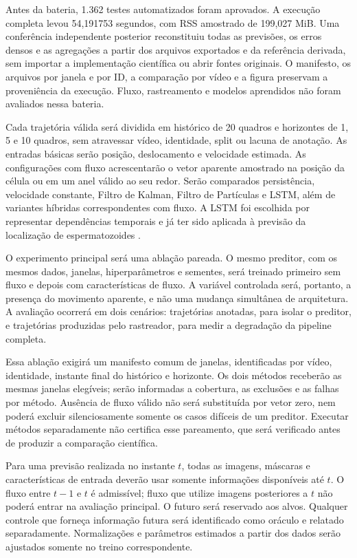 Antes da bateria, 1.362 testes automatizados foram aprovados. A execução completa levou 54,191753 segundos, com RSS amostrado de 199,027 MiB. Uma conferência independente posterior reconstituiu todas as previsões, os erros densos e as agregações a partir dos arquivos exportados e da referência derivada, sem importar a implementação científica ou abrir fontes originais. O manifesto, os arquivos por janela e por ID, a comparação por vídeo e a figura preservam a proveniência da execução. Fluxo, rastreamento e modelos aprendidos não foram avaliados nessa bateria.

Cada trajetória válida será dividida em histórico de 20 quadros e horizontes de 1, 5 e 10 quadros, sem atravessar vídeo, identidade, split ou lacuna de anotação. As entradas básicas serão posição, deslocamento e velocidade estimada. As configurações com fluxo acrescentarão o vetor aparente amostrado na posição da célula ou em um anel válido ao seu redor. Serão comparados persistência, velocidade constante, Filtro de Kalman, Filtro de Partículas e LSTM, além de variantes híbridas correspondentes com fluxo. A LSTM foi escolhida por representar dependências temporais e já ter sido aplicada à previsão da localização de espermatozoides \cite{noy2023location}.

O experimento principal será uma ablação pareada. O mesmo preditor, com os mesmos dados, janelas, hiperparâmetros e sementes, será treinado primeiro sem fluxo e depois com características de fluxo. A variável controlada será, portanto, a presença do movimento aparente, e não uma mudança simultânea de arquitetura. A avaliação ocorrerá em dois cenários: trajetórias anotadas, para isolar o preditor, e trajetórias produzidas pelo rastreador, para medir a degradação da pipeline completa.

Essa ablação exigirá um manifesto comum de janelas, identificadas por vídeo, identidade, instante final do histórico e horizonte. Os dois métodos receberão as mesmas janelas elegíveis; serão informadas a cobertura, as exclusões e as falhas por método. Ausência de fluxo válido não será substituída por vetor zero, nem poderá excluir silenciosamente somente os casos difíceis de um preditor. Executar métodos separadamente não certifica esse pareamento, que será verificado antes de produzir a comparação científica.

Para uma previsão realizada no instante $t$, todas as imagens, máscaras e características de entrada deverão usar somente informações disponíveis até $t$. O fluxo entre $t-1$ e $t$ é admissível; fluxo que utilize imagens posteriores a $t$ não poderá entrar na avaliação principal. O futuro será reservado aos alvos. Qualquer controle que forneça informação futura será identificado como oráculo e relatado separadamente. Normalizações e parâmetros estimados a partir dos dados serão ajustados somente no treino correspondente.


